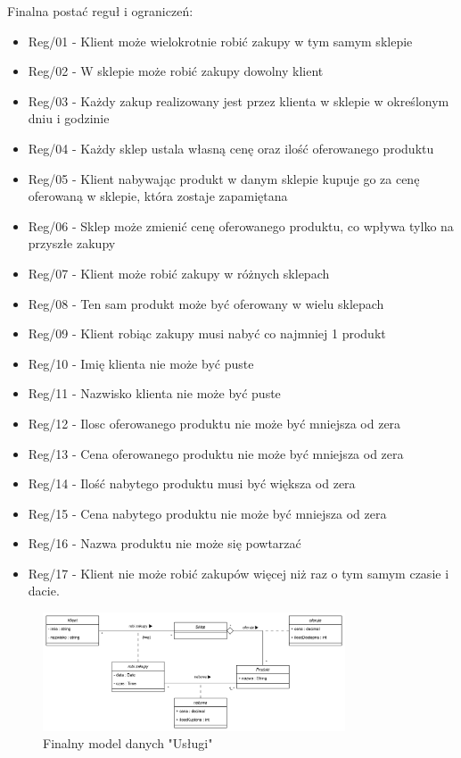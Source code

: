\documentclass[a4paper,12pt]{article}
\begin{document}
Finalna postać reguł i ograniczeń:

\begin{itemize}
    \item Reg/01 - Klient może wielokrotnie robić zakupy w tym samym sklepie
    \item Reg/02 - W sklepie może robić zakupy dowolny klient
    \item Reg/03 - Każdy zakup realizowany jest przez klienta w sklepie w określonym dniu i godzinie
    \item Reg/04 - Każdy sklep ustala własną cenę oraz ilość oferowanego produktu 
    \item Reg/05 - Klient nabywając produkt w danym sklepie kupuje go za cenę oferowaną w sklepie, która zostaje zapamiętana
    \item Reg/06 - Sklep może zmienić cenę oferowanego produktu, co wpływa tylko na przyszłe zakupy
    \item Reg/07 - Klient może robić zakupy w różnych sklepach
    \item Reg/08 - Ten sam produkt może być oferowany w wielu sklepach
    \item Reg/09 - Klient robiąc zakupy musi nabyć co najmniej 1 produkt
    \item Reg/10 - Imię klienta nie może być puste
    \item Reg/11 - Nazwisko klienta nie może być puste
    \item Reg/12 - Ilosc oferowanego produktu nie może być mniejsza od zera
    \item Reg/13 - Cena oferowanego produktu nie może być mniejsza od zera
    \item Reg/14 - Ilość nabytego produktu musi być większa od zera
    \item Reg/15 - Cena nabytego produktu nie może być mniejsza od zera
    \item Reg/16 - Nazwa produktu nie może się powtarzać
    \item Reg/17 - Klient nie może robić zakupów więcej niż raz o tym samym czasie i dacie.
\end{itemize}

\begin{figure}[H]
\centering
\includegraphics[width=0.8\textwidth]{images/improved.png}
\caption{Finalny model danych "Usługi"}
\label{fig:final_model}
\end{figure}
\end{document}
